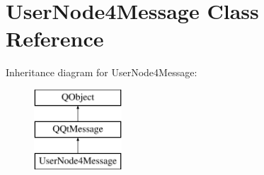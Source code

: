 \hypertarget{class_user_node4_message}{}\section{User\+Node4\+Message Class Reference}
\label{class_user_node4_message}
Inheritance diagram for User\+Node4\+Message\+:\begin{figure}[H]
\begin{center}
\leavevmode
\includegraphics[height=3.000000cm]{class_user_node4_message}
\end{center}
\end{figure}
